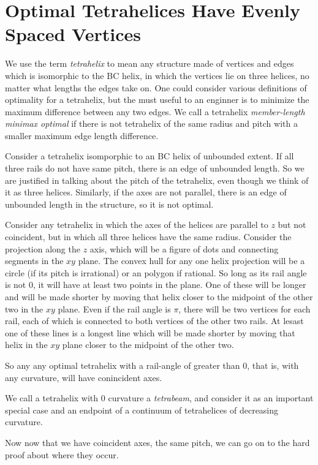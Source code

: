 \documentclass[11pt]{article}
\begin{document}
\section{Optimal Tetrahelices Have Evenly Spaced Vertices}

We use the term \emph{tetrahelix} to mean any structure made of vertices and edges which is isomorphic to the BC helix,
in which the vertices lie on three helices, 
no matter what lengths the edges take on. One could consider various definitions of optimality for a tetrahelix,
but the must useful to an enginner is to minimize the maximum difference between any two edges. We call a
tetrahelix \emph{member-length minimax optimal} if there is not tetrahelix of the same radius and pitch with a smaller
maximum edge length difference.

Consider a tetrahelix isomporphic to an BC helix of unbounded extent. If all three rails do not have same pitch, there
is an edge of unbounded length. So we are justified in talking about the pitch of the tetrahelix, even though we think
of it as three helices. Similarly, if the axes are not parallel, there is an edge of unbounded length in the structure,
so it is not optimal.

Consider any tetrahelix in which the axes of the helices are parallel to $z$ but not coincident, but in which all three helices have the same
radius. Consider the projection along the $z$ axis, which will be a figure of dots and connecting segments in the $xy$ plane. The convex
hull for any one helix projection will be a circle (if its pitch is irrational) or an polygon if rational. So long as its rail angle is
not $0$, it will have at least two points in the plane. One of these will be longer and will be made shorter by moving that helix closer
to the midpoint of the other two in the $xy$ plane. Even if the rail angle is $\pi$, there will be two vertices for each rail, each of
which is connected to both vertices of the other two rails. At lesast one of these lines is a longest line which will be made shorter by moving
that helix in the $xy$ plane closer to the midpoint of the other two.

So any any optimal tetrahelix with a rail-angle of greater than $0$, that is, with any curvature, will have conincident axes.

We call a tetrahelix with $0$ curvature a \emph{tetrabeam}, and consider it as an important special case and an endpoint of a continuum
of tetrahelices of decreasing curvature.


 Now now that we have coincident axes, the same pitch, we can go on to the hard proof about where they occur.
\end{document}
